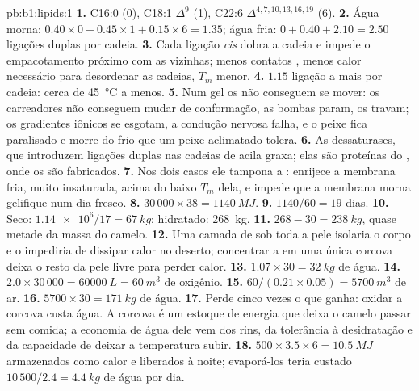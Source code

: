 \begin{solution}{pb:b1:lipids:1}
\textbf{1.} C16:0 (0), C18:1 $\Delta^9$ (1), C22:6 $\Delta^{4,7,10,13,16,19}$
(6).
\textbf{2.} Água morna: $0.40\times 0 + 0.45\times 1 + 0.15\times 6 = 1.35$;
água fria: $0 + 0.40 + 2.10 = 2.50$ ligações duplas por cadeia.
\textbf{3.} Cada ligação \emph{cis} dobra a cadeia e impede o
empacotamento próximo com as vizinhas; menos contatos ,
menos calor necessário para desordenar as cadeias, $T_m$ menor.
\textbf{4.} $1.15$ ligação a mais por cadeia: cerca de
\qty{45}{\celsius} a menos.
\textbf{5.} Num gel os  não conseguem se mover: os carreadores
não conseguem mudar de conformação, as bombas param, os  travam;
os gradientes iônicos se esgotam, a condução nervosa falha, e o peixe
fica paralisado e morre do frio que um peixe aclimatado tolera.
\textbf{6.} As dessaturases, que introduzem ligações duplas nas cadeias
de acila graxa; elas são proteínas  do , onde os  são fabricados.
\textbf{7.} Nos dois casos ele tampona a : enrijece a membrana
fria, muito insaturada, acima do baixo $T_m$ dela, e impede que a
membrana morna gelifique num dia fresco.
\textbf{8.} $30\,000\times 38 = \qty{1140}{MJ}$.
\textbf{9.} $1140/60 = 19$ dias.
\textbf{10.} Seco: $\num{1.14e6}/17 = \qty{67}{kg}$; hidratado:
\qty{268}{kg}.
\textbf{11.} $268 - 30 = \qty{238}{kg}$, quase metade da massa do
camelo.
\textbf{12.} Uma camada de  sob toda a pele isolaria o corpo e o
impediria de dissipar calor no deserto; concentrar a  em uma
única corcova deixa o resto da pele livre para perder calor.
\textbf{13.} $1.07\times 30 = \qty{32}{kg}$ de água.
\textbf{14.} $2.0\times 30\,000 = \qty{60000}{L} = \qty{60}{m^3}$ de
oxigênio.
\textbf{15.} $60/(0.21\times 0.05) = \qty{5700}{m^3}$ de ar.
\textbf{16.} $5700\times 30 = \qty{171}{kg}$ de água.
\textbf{17.} Perde cinco vezes o que ganha: oxidar a corcova custa
água. A corcova é um estoque de energia que deixa o camelo passar sem
comida; a economia de água dele vem dos rins, da tolerância à
desidratação e da capacidade de deixar a temperatura subir.
\textbf{18.} $500\times 3.5\times 6 = \qty{10.5}{MJ}$ armazenados como calor e liberados à noite; evaporá-los teria custado $10\,500/2.4 = \qty{4.4}{kg}$ de água por dia.

\end{solution}
